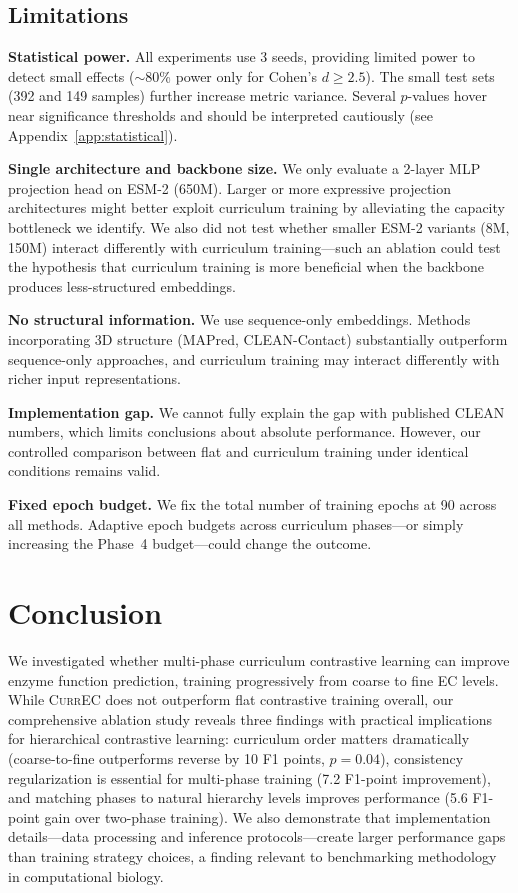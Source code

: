 \documentclass{article}
\newcommand{\currec}{\textsc{CurrEC}}
\begin{document}
\subsection{Limitations}

\textbf{Statistical power.} All experiments use 3 seeds, providing limited power to detect small effects (${\sim}$80\% power only for Cohen's $d \geq 2.5$). The small test sets (392 and 149 samples) further increase metric variance. Several $p$-values hover near significance thresholds and should be interpreted cautiously (see Appendix~\ref{app:statistical}).

\textbf{Single architecture and backbone size.} We only evaluate a 2-layer MLP projection head on ESM-2 (650M). Larger or more expressive projection architectures might better exploit curriculum training by alleviating the capacity bottleneck we identify. We also did not test whether smaller ESM-2 variants (8M, 150M) interact differently with curriculum training---such an ablation could test the hypothesis that curriculum training is more beneficial when the backbone produces less-structured embeddings.

\textbf{No structural information.} We use sequence-only embeddings. Methods incorporating 3D structure (MAPred, CLEAN-Contact) substantially outperform sequence-only approaches, and curriculum training may interact differently with richer input representations.

\textbf{Implementation gap.} We cannot fully explain the gap with published CLEAN numbers, which limits conclusions about absolute performance. However, our controlled comparison between flat and curriculum training under identical conditions remains valid.

\textbf{Fixed epoch budget.} We fix the total number of training epochs at 90 across all methods. Adaptive epoch budgets across curriculum phases---or simply increasing the Phase~4 budget---could change the outcome.

\section{Conclusion}

We investigated whether multi-phase curriculum contrastive learning can improve enzyme function prediction, training progressively from coarse to fine EC levels. While \currec{} does not outperform flat contrastive training overall, our comprehensive ablation study reveals three findings with practical implications for hierarchical contrastive learning: curriculum order matters dramatically (coarse-to-fine outperforms reverse by 10 F1 points, $p = 0.04$), consistency regularization is essential for multi-phase training (7.2 F1-point improvement), and matching phases to natural hierarchy levels improves performance (5.6 F1-point gain over two-phase training). We also demonstrate that implementation details---data processing and inference protocols---create larger performance gaps than training strategy choices, a finding relevant to benchmarking methodology in computational biology.
\end{document}

